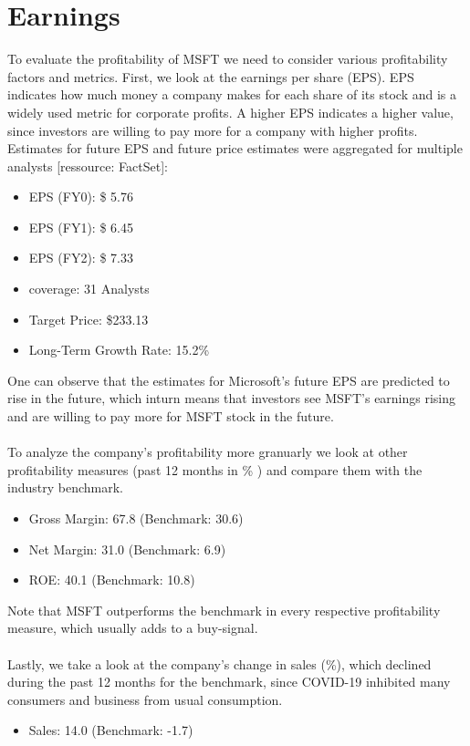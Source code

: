 \documentclass[]{article}
\begin{document}
\section{Earnings}
\noindent To evaluate the profitability of MSFT we need to consider various profitability factors and metrics. First, we look at the earnings per share (EPS). EPS indicates how much money a company makes for each share of its stock and is a widely used metric for corporate profits. A higher EPS indicates a higher value, since investors are willing to pay more for a company with higher profits.\cite{chen_2020}
Estimates for future EPS and future price estimates were aggregated for multiple analysts [ressource: FactSet]:
\begin{itemize}
\item EPS (FY0): \$ 5.76
\item EPS (FY1): \$ 6.45
\item EPS (FY2): \$ 7.33
\item coverage: 31 Analysts
\item Target Price: \$233.13
\item Long-Term Growth Rate: 15.2\%
\end{itemize}
One can observe that the estimates for Microsoft's future EPS are predicted to rise in the future, which inturn means that investors see MSFT's earnings rising and are willing to pay more for MSFT stock in the future.\\\\
To analyze the company's profitability more granuarly we look at other profitability measures (past 12 months in \% ) and compare them with the industry benchmark.
\begin{itemize}
\item Gross Margin: 67.8 (Benchmark: 30.6)
\item Net Margin: 31.0 (Benchmark: 6.9)
\item ROE: 40.1 (Benchmark: 10.8)
\end{itemize}

\noindent Note that MSFT outperforms the benchmark in every respective profitability measure, which usually adds to a  buy-signal.\\\\
Lastly, we take a look at the company's change in sales (\%), which declined during the past 12 months for the benchmark, since COVID-19 inhibited many consumers and business from usual consumption.
\begin{itemize}
	\item Sales: 14.0 (Benchmark: -1.7)
\end{itemize}
\end{document}

